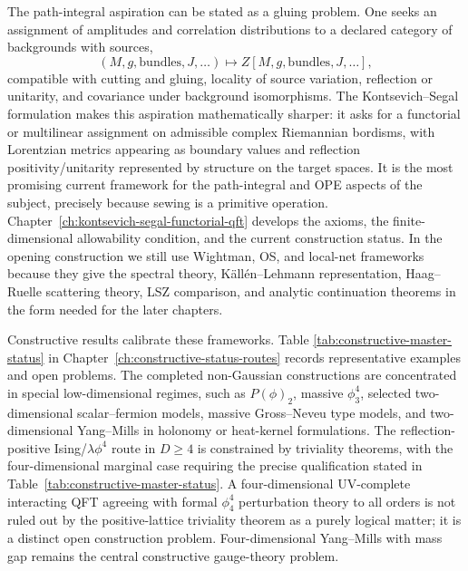 The path-integral aspiration can be stated as a gluing problem.  One seeks an
assignment of amplitudes and correlation distributions to a declared category
of backgrounds with sources,
\[
  (M,g,\text{bundles},J,\ldots)
  \longmapsto
  Z[M,g,\text{bundles},J,\ldots],
\]
compatible with cutting and gluing, locality of source variation, reflection
or unitarity, and covariance under background isomorphisms.  The
Kontsevich--Segal formulation makes this aspiration mathematically sharper:
it asks for a functorial or multilinear assignment on admissible complex
Riemannian bordisms, with Lorentzian metrics appearing as boundary values and
reflection positivity/unitarity represented by structure on the target
spaces.  It is the most promising current framework for the path-integral
and OPE aspects of the subject, precisely because sewing is a primitive
operation.  Chapter~\ref{ch:kontsevich-segal-functorial-qft} develops the
axioms, the finite-dimensional allowability condition, and the current
construction status.  In the opening construction we still use Wightman, OS,
and local-net frameworks because they give the spectral theory,
K\"all\'en--Lehmann representation, Haag--Ruelle scattering theory, LSZ
comparison, and analytic continuation theorems in the form needed for the
later chapters.

Constructive results calibrate these frameworks.  Table
\ref{tab:constructive-master-status} in
Chapter~\ref{ch:constructive-status-routes} records representative examples
and open problems.  The completed non-Gaussian constructions are concentrated
in special low-dimensional regimes, such as \(P(\phi)_2\), massive
\(\phi^4_3\), selected two-dimensional scalar--fermion models, massive
Gross--Neveu type models, and two-dimensional Yang--Mills in holonomy or
heat-kernel formulations.  The reflection-positive
Ising/\(\lambda\phi^4\) route in \(D\ge4\) is constrained by triviality
theorems, with the four-dimensional marginal case requiring the precise
qualification stated in Table~\ref{tab:constructive-master-status}.  A
four-dimensional UV-complete interacting QFT agreeing with formal
\(\phi^4_4\) perturbation theory to all orders is not ruled out by the
positive-lattice triviality theorem as a purely logical matter; it is a
distinct open construction problem.  Four-dimensional Yang--Mills with mass
gap remains the central constructive gauge-theory problem.

